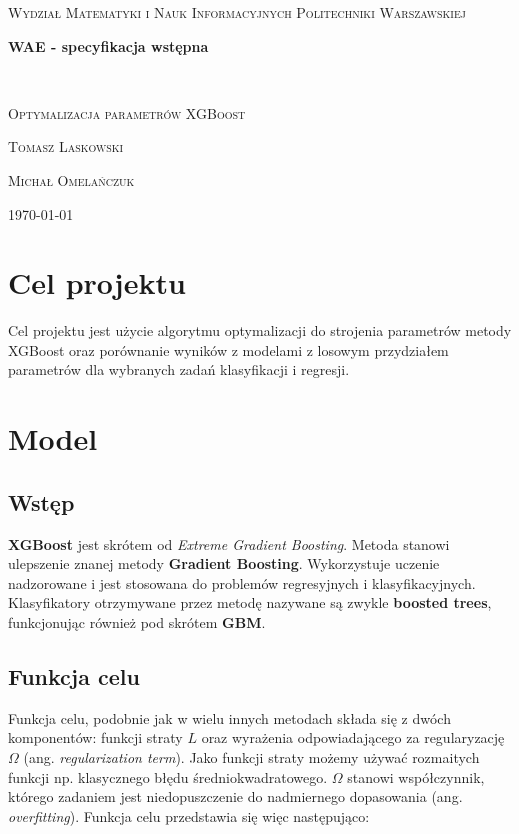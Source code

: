 \documentclass[a4paper,12p]{article}
\begin{document}
\thispagestyle{empty}
	\begin{center}
		{\scshape\Large Wydział Matematyki i Nauk Informacyjnych Politechniki Warszawskiej \par}
		\vspace{3cm}
		{\huge\bfseries WAE - specyfikacja wstępna\par}\
		\vspace{1cm}
		{\Large\scshape Optymalizacja parametrów XGBoost\par}
		\vspace{3cm}
		{\scshape Tomasz Laskowski\par}
		{\scshape Michał Omelańczuk\par}
		\vspace{8cm}
		{\Large \today}
		\vspace{1cm}
	\end{center}
	
	\newpage

\section{Cel projektu}

Cel projektu jest użycie algorytmu optymalizacji do strojenia parametrów metody XGBoost oraz porównanie wyników z modelami z losowym przydziałem parametrów dla wybranych zadań klasyfikacji i regresji.

\section{Model}

\subsection{Wstęp}

\textbf{XGBoost} jest skrótem od \textit{Extreme Gradient Boosting}. Metoda stanowi ulepszenie znanej metody \textbf{Gradient Boosting}. Wykorzystuje uczenie nadzorowane i jest stosowana do problemów regresyjnych i klasyfikacyjnych. Klasyfikatory otrzymywane przez metodę nazywane są zwykle \textbf{boosted trees}, funkcjonując również pod skrótem \textbf{GBM}.

\subsection{Funkcja celu}

Funkcja celu, podobnie jak w wielu innych metodach składa się z dwóch komponentów: funkcji straty $L$ oraz wyrażenia odpowiadającego za regularyzację $\Omega$ (ang. \textit{regularization term}). Jako funkcji straty możemy używać rozmaitych funkcji np. klasycznego błędu średniokwadratowego. $\Omega$ stanowi współczynnik, którego zadaniem jest niedopuszczenie do nadmiernego dopasowania (ang. \textit{overfitting}). Funkcja celu przedstawia się więc następująco:
\end{document}

